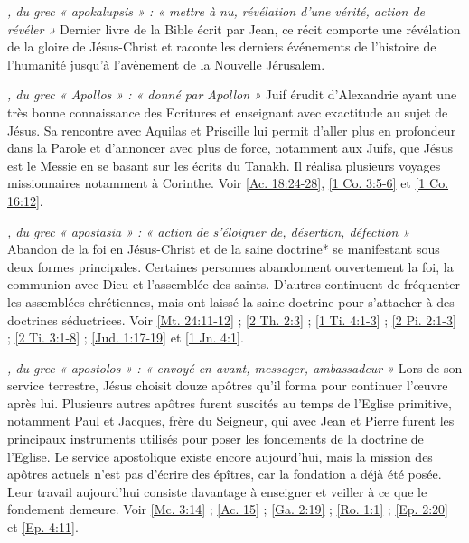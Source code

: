 \begin{multicols}{2}
\textit{, du grec « apokalupsis » : « mettre à nu, révélation d'une vérité, action de révéler »}\newline
Dernier livre de la Bible écrit par Jean, ce récit comporte une révélation de la gloire de Jésus-Christ et raconte les derniers événements de l'histoire de l'humanité jusqu'à l'avènement de la Nouvelle Jérusalem.

\textit{, du grec « Apollos » : « donné par Apollon »}\newline
Juif érudit d'Alexandrie ayant une très bonne connaissance des Ecritures et enseignant avec exactitude au sujet de Jésus. Sa rencontre avec Aquilas et Priscille lui permit d'aller plus en profondeur dans la Parole et d'annoncer avec plus de force, notamment aux Juifs, que Jésus est le Messie en se basant sur les écrits du Tanakh. Il réalisa plusieurs voyages missionnaires notamment à Corinthe. Voir \vref{Ac. 18:24-28}, \vref{1 Co. 3:5-6} et \vref{1 Co. 16:12}.

\textit{, du grec « apostasia » : « action de s'éloigner de, désertion, défection »}\newline
Abandon de la foi en Jésus-Christ et de la saine doctrine* se manifestant sous deux formes principales. Certaines personnes abandonnent ouvertement la foi, la communion avec Dieu et l'assemblée des saints. D'autres continuent de fréquenter les assemblées chrétiennes, mais ont laissé la saine doctrine pour s'attacher à des doctrines séductrices. Voir \vref{Mt. 24:11-12} ; \vref{2 Th. 2:3} ; \vref{1 Ti. 4:1-3} ; \vref{2 Pi. 2:1-3} ; \vref{2 Ti. 3:1-8} ; \vref{Jud. 1:17-19} et \vref{1 Jn. 4:1}.

\textit{, du grec « apostolos » : « envoyé en avant, messager, ambassadeur »}\newline
Lors de son service terrestre, Jésus choisit douze apôtres qu'il forma pour continuer l'œuvre après lui. Plusieurs autres apôtres furent suscités au temps de l'Eglise primitive, notamment Paul et Jacques, frère du Seigneur, qui avec Jean et Pierre furent les principaux instruments utilisés pour poser les fondements de la doctrine de l'Eglise. Le service apostolique existe encore aujourd'hui, mais la mission des apôtres actuels n'est pas d'écrire des épîtres, car la fondation a déjà été posée. Leur travail aujourd'hui consiste davantage à enseigner et veiller à ce que le fondement demeure. Voir \vref{Mc. 3:14} ; \vref{Ac. 15} ; \vref{Ga. 2:19} ; \vref{Ro. 1:1} ; \vref{Ep. 2:20} et \vref{Ep. 4:11}.


\end{multicols}
